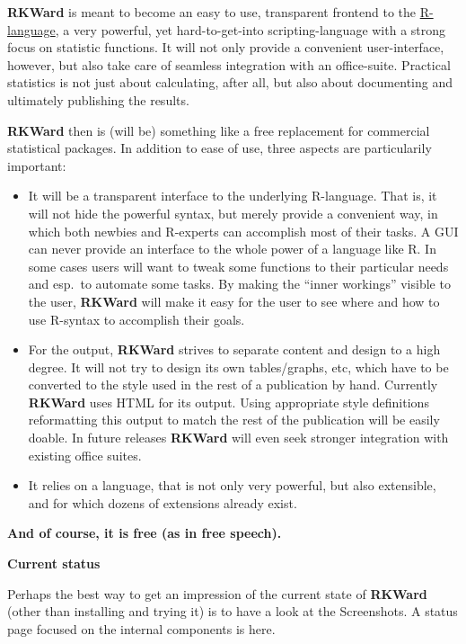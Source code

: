 \documentclass[
  letterpaper,
  DIV=11,
  numbers=noendperiod]{scrreprt}
\begin{document}
\textbf{RKWard} is meant to become an easy to use, transparent frontend
to the \href{http://r-project.org/}{R-language}, a very powerful, yet
hard-to-get-into scripting-language with a strong focus on statistic
functions. It will not only provide a convenient user-interface,
however, but also take care of seamless integration with an
office-suite. Practical statistics is not just about calculating, after
all, but also about documenting and ultimately publishing the results.

\textbf{RKWard} then is (will be) something like a free replacement for
commercial statistical packages. In addition to ease of use, three
aspects are particularily important:

\begin{itemize}
\item
  It will be a transparent interface to the underlying R-language. That
  is, it will not hide the powerful syntax, but merely provide a
  convenient way, in which both newbies and R-experts can accomplish
  most of their tasks. A GUI can never provide an interface to the whole
  power of a language like R. In some cases users will want to tweak
  some functions to their particular needs and esp.~to automate some
  tasks. By making the ``inner workings'' visible to the user,
  \textbf{RKWard} will make it easy for the user to see where and how to
  use R-syntax to accomplish their goals.
\item
  For the output, \textbf{RKWard} strives to separate content and design
  to a high degree. It will not try to design its own tables/graphs,
  etc, which have to be converted to the style used in the rest of a
  publication by hand. Currently \textbf{RKWard} uses HTML for its
  output. Using appropriate style definitions reformatting this output
  to match the rest of the publication will be easily doable. In future
  releases \textbf{RKWard} will even seek stronger integration with
  existing office suites.
\item
  It relies on a language, that is not only very powerful, but also
  extensible, and for which dozens of extensions already exist.
\end{itemize}

\textbf{And of course, it is free (as in free speech).}

\textbf{Current status}

Perhaps the best way to get an impression of the current state of
\textbf{RKWard} (other than installing and trying it) is to have a look
at the Screenshots. A status page focused on the internal components is
here.
\end{document}
